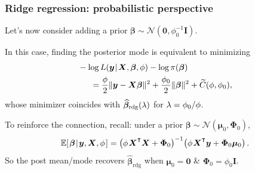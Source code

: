 \documentclass[18pt]{beamer}
\newcommand{\defineTightSpacing}{%
	\setlength{\abovedisplayskip}{.25\baselineskip}%
	\setlength{\belowdisplayskip}{.25\baselineskip}%
}
\newcommand{\given}{\thinnerspace | \thinnerspace}
\newcommand{\transpose}{\text{\raisebox{.5ex}{$\intercal$}}}
\newcommand{\thinnerspace}{\mskip.5\thinmuskip}
\newcommand{\expectation}{\mathbb{E}}
\newcommand{\normalDist}{\mathcal{N}}
\newcommand{\density}{\operatorname{\pi}}
\newcommand{\likelihood}{L}
\newcommand{\by}{\bm{y}}
\newcommand{\bX}{\bm{X}}
\newcommand{\bmu}{\bm{\mu}}
\newcommand{\bbeta}{\bm{\beta}}
\newcommand{\Id}{\bm{I}}
\newcommand{\bPhi}{\bm{\Phi}}
\begin{document}
\begin{frame}
\frametitle{Ridge regression: probabilistic perspective}
Let's now consider adding a prior $\bbeta \sim \normalDist(\bm{0}, \phi_0^{-1} \Id)$. 

\pause
\smallskip
In this case, finding the posterior mode is equivalent to minimizing
\begin{equation*} \defineTightSpacing%
\begin{aligned}
&- \log \likelihood(\by \given \bX, \bbeta, \phi) - \log \density(\bbeta)\\
	&\hspace*{1.5em}= \frac{\phi}{2} \| \by - \bX \bbeta \|^2 + \frac{\phi_0}{2} \| \bbeta \|^2 + \widetilde{C}(\phi, \phi_0),
\end{aligned}
\end{equation*}
whose minimizer coincides with $\widehat{\bbeta}_{\mathrm{rdg}}(\penaltyParam)$ for $\lambda = \phi_0 / \phi$.

\pause
\smallskip
To reinforce the connection, recall: under a prior $\bbeta \sim \normalDist(\bmu_0, \bPhi_0)$,
\begin{equation*} \defineTightSpacing%
\expectation\!\left[
	\thinnerspace \bbeta \given \by, \bX, \phi \thinnerspace
\right]
	= \left( \phi \thinnerspace \bX^\transpose \bX + \bPhi_0 \right)^{-1} \! \left( \phi \thinnerspace \bX^\transpose \bm{y} + \bPhi_0 \bmu_0 \right).
\end{equation*}
So the post mean/mode recovers $\widehat{\bbeta}_{\mathrm{rdg}}$ when $\bmu_0 = \bm{0}$ \& $\bPhi_0 = \phi_0 \Id$.
\end{frame}
\end{document}
